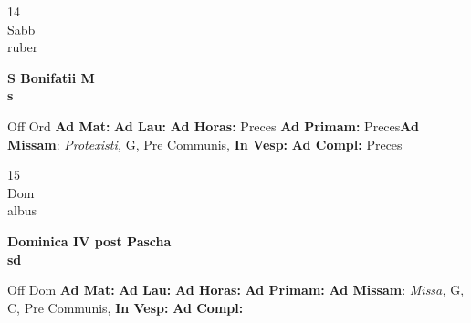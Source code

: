 \documentclass[10pt, openany]{book}
\begin{document}
    \begin{center}
        \begin{minipage}{3.5in}
            \vspace{2em}
            \begin{minipage}{0.5in}
                {\Huge 14} \\
                {\normalsize Sabb} \\
                {\normalsize ruber}
            \end{minipage}
            \begin{minipage}{3.0in}
                \textbf{ \large S Bonifatii M \\
                \textnormal{\normalsize s}} \\ 
            \end{minipage}
            \begin{justify}Off Ord
                \textbf{Ad Mat: }
                \textbf{Ad Lau: }
                \textbf{Ad Horas: }Preces
                \textbf{Ad Primam: }Preces\textbf{Ad Missam}: \textit{Protexisti,} G, Pre Communis,  
                \textbf{In Vesp: }
                \textbf{Ad Compl: }Preces
            \end{justify}
        \end{minipage}
    \end{center}

    \begin{center}
        \begin{minipage}{3.5in}
            \vspace{2em}
            \begin{minipage}{0.5in}
                {\Huge 15} \\
                {\normalsize Dom} \\
                {\normalsize albus}
            \end{minipage}
            \begin{minipage}{3.0in}
                \textbf{ \large Dominica IV post Pascha \\
                \textnormal{\normalsize sd}} \\ 
            \end{minipage}
            \begin{justify}Off Dom
                \textbf{Ad Mat: }
                \textbf{Ad Lau: }
                \textbf{Ad Horas: }
                \textbf{Ad Primam: }\textbf{Ad Missam}: \textit{Missa,} G, C, Pre Communis,  
                \textbf{In Vesp: }
                \textbf{Ad Compl: }
            \end{justify}
        \end{minipage}
    \end{center}
\end{document}
